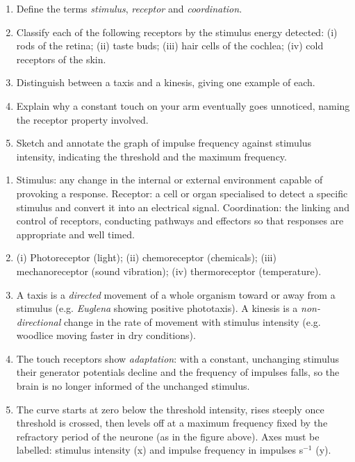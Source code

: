 \documentclass[11pt]{article}
\begin{document}
\begin{exercice}
\begin{enumerate}
\item Define the terms \emph{stimulus}, \emph{receptor} and \emph{coordination}.
\item Classify each of the following receptors by the stimulus energy detected: (i) rods of the retina; (ii) taste buds; (iii) hair cells of the cochlea; (iv) cold receptors of the skin.
\item Distinguish between a taxis and a kinesis, giving one example of each.
\item Explain why a constant touch on your arm eventually goes unnoticed, naming the receptor property involved.
\item Sketch and annotate the graph of impulse frequency against stimulus intensity, indicating the threshold and the maximum frequency.
\end{enumerate}
\end{exercice}

\begin{corrige}[Exercise 1]
\begin{enumerate}
\item Stimulus: any change in the internal or external environment capable of provoking a response. Receptor: a cell or organ specialised to detect a specific stimulus and convert it into an electrical signal. Coordination: the linking and control of receptors, conducting pathways and effectors so that responses are appropriate and well timed.
\item (i) Photoreceptor (light); (ii) chemoreceptor (chemicals); (iii) mechanoreceptor (sound vibration); (iv) thermoreceptor (temperature).
\item A taxis is a \emph{directed} movement of a whole organism toward or away from a stimulus (e.g. \emph{Euglena} showing positive phototaxis). A kinesis is a \emph{non-directional} change in the rate of movement with stimulus intensity (e.g. woodlice moving faster in dry conditions).
\item The touch receptors show \emph{adaptation}: with a constant, unchanging stimulus their generator potentials decline and the frequency of impulses falls, so the brain is no longer informed of the unchanged stimulus.
\item The curve starts at zero below the threshold intensity, rises steeply once threshold is crossed, then levels off at a maximum frequency fixed by the refractory period of the neurone (as in the figure above). Axes must be labelled: stimulus intensity (x) and impulse frequency in impulses s$^{-1}$ (y).
\end{enumerate}
\end{corrige}
\end{document}

